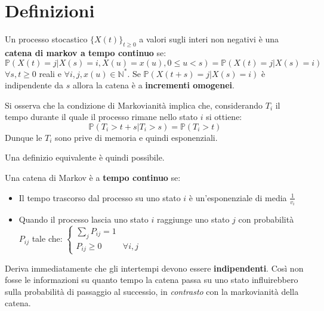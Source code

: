 \section{Definizioni}
\begin{definition}
Un processo stocastico $\{X(t)\}_{t\geq0}$ a valori sugli interi non negativi è una \textbf{catena di markov a tempo continuo} se:
\[\mathbb{P}(X(t)=j|X(s)=i,X(u)=x(u),0\leq u<s)=\mathbb{P}(X(t)=j|X(s)=i)\]
$\forall s,t\geq0$ reali e $\forall i,j,x(u)\in\mathbb{N}^*$.
\newline
Se $\mathbb{P}(X(t+s)=j|X(s)=i)$ è indipendente da $s$ allora la catena è a \textbf{incrementi omogenei}. 
\end{definition}

Si osserva che la condizione di Markovianità implica che,
 considerando $T_i$ il tempo durante il quale il processo rimane nello stato $i$ si ottiene:
\[\mathbb{P}(T_i>t+s|T_i>s)=\mathbb{P}(T_i>t)\]
Dunque le $T_i$ sono prive di memoria e quindi esponenziali.

Una definizio equivalente è quindi possibile.

\begin{definition}
Una catena di Markov è a \textbf{tempo continuo} se:
\begin{itemize}
    \item Il tempo trascorso dal processo su uno stato $i$ è un'esponenziale di media $\frac{1}{v_i}$
    \item Quando il processo lascia uno stato $i$ raggiunge uno stato $j$ con probabilità $P_{ij}$ tale che: $\begin{cases}
    \sum_{j}P_{ij}=1 \\
    P_{ij}\geq0 & \forall i,j
    \end{cases}$
\end{itemize}
\end{definition}

Deriva immediatamente che gli intertempi devono essere \textbf{indipendenti}. Così non fosse le informazioni su quanto tempo la catena passa su uno stato influirebbero sulla probabilità di passaggio al successio, in \textit{contrasto} con la markovianità della catena.

